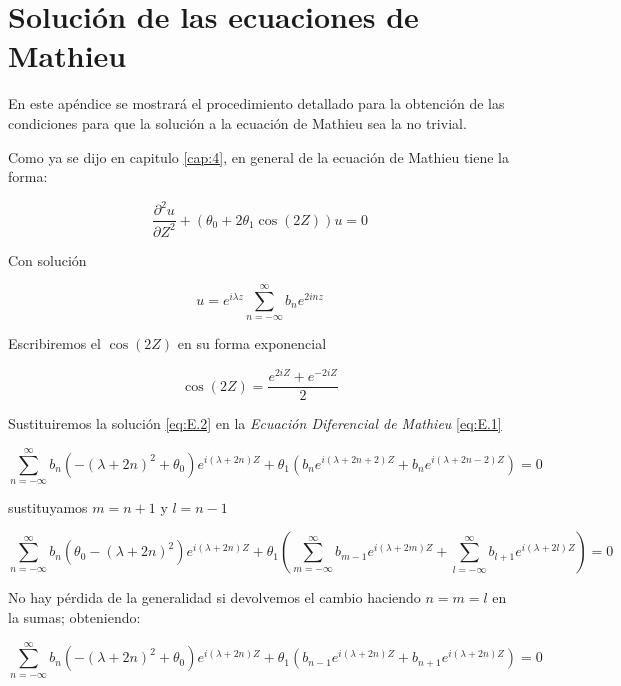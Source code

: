 \chapter{Solución de las ecuaciones de Mathieu}\label{apendice:E}

En este apéndice se mostrará el procedimiento detallado para la obtención de las condiciones para que la solución a la ecuación de Mathieu sea la no trivial.

Como ya se dijo en capitulo \ref{cap:4}, en general de la ecuación de Mathieu tiene la forma:

\begin{equation}\label{eq:E.1}
    \frac{\partial^2u}{\partial Z^2}+\left(\theta_0+2\theta_1\cos(2Z)\right)u=0
\end{equation}

Con solución 

\begin{equation}\label{eq:E.2}
    u=e^{i\lambda z}\sum^{\infty}_{n=-\infty} b_n e^{2inz}
\end{equation}

Escribiremos el $\cos(2Z)$ en su forma exponencial

\begin{equation}\label{eq:E.3}
    \cos(2Z)=\frac{e^{2iZ}+e^{-2iZ}}{2}
\end{equation}

Sustituiremos la solución \ref{eq:E.2} en la \textit{Ecuación Diferencial de Mathieu} \ref{eq:E.1} 

\begin{equation}\label{eq:E.4}
    \sum^{\infty}_{n=-\infty} b_n\left(-(\lambda+2n)^2+\theta_0\right)e^{i\left(\lambda+2n\right) Z}+\theta_1\left( b_ne^{i\left(\lambda+2n+2\right)Z}+b_ne^{i\left(\lambda+2n-2\right)Z}\right)=0
\end{equation}

sustituyamos $m=n+1$ y $l=n-1$

\begin{equation}\label{eq:E.5}
    \sum^{\infty}_{n=-\infty} b_n\left(\theta_0-\left(\lambda+2n\right)^2\right)e^{i\left(\lambda+2n\right) Z}+\theta_1\left( \sum^{\infty}_{m=-\infty}b_{m-1}e^{i\left(\lambda+2m\right)Z}+\sum^{\infty}_{l=-\infty}b_{l+1}e^{i\left(\lambda+2l\right)Z}\right)=0
\end{equation}

No hay pérdida de la generalidad si devolvemos el cambio haciendo $n=m=l$ en la sumas; obteniendo:

\begin{equation}\label{eq:E.6}
    \sum^{\infty}_{n=-\infty} b_n\left(-(\lambda+2n)^2+\theta_0\right)e^{i(\lambda+2n) Z}+\theta_1( b_{n-1}e^{i(\lambda+2n)Z}+b_{n+1}e^{i(\lambda+2n)Z})=0
\end{equation}

